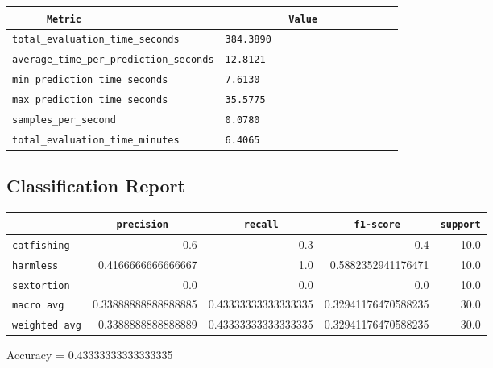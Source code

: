 \documentclass{article}
\begin{document}
\begin{center}
\begin{tabular}{l | l} \hline
    \verb|      Metric     | & \verb|           Value           | \\ \hline
    \hline
    \verb|total_evaluation_time_seconds| & \verb|384.3890                     | \\ \hline
    \verb|average_time_per_prediction_seconds| & \verb|12.8121                      | \\ \hline
    \verb|min_prediction_time_seconds| & \verb|7.6130                       | \\ \hline
    \verb|max_prediction_time_seconds| & \verb|35.5775                      | \\ \hline
    \verb|samples_per_second| & \verb|0.0780                       | \\ \hline
    \verb|total_evaluation_time_minutes| & \verb|6.4065                       | \\ \hline
\end{tabular}
\end{center}

\subsection{Classification Report}

\begin{center}
\begin{tabular}{l | r | r | r | r} \hline
    \verb|            | & \verb|    precision     | & \verb|      recall      | & \verb|     f1-score     | & \verb|support| \\ \hline
    \hline
    \verb|catfishing | & 0.6 & 0.3 & 0.4 &    10.0 \\ \hline
    \verb|harmless   | & 0.4166666666666667 & 1.0 & 0.5882352941176471 &    10.0 \\ \hline
    \verb|sextortion | & 0.0 & 0.0 & 0.0 &    10.0 \\ \hline
    \verb|macro avg  | & 0.33888888888888885 & 0.43333333333333335 & 0.32941176470588235 &    30.0 \\ \hline
    \verb|weighted avg| & 0.3388888888888889 & 0.43333333333333335 & 0.32941176470588235 &    30.0 \\ \hline
\end{tabular}
\end{center}

\begin{center}
Accuracy = 0.43333333333333335
\end{center}
\end{document}
